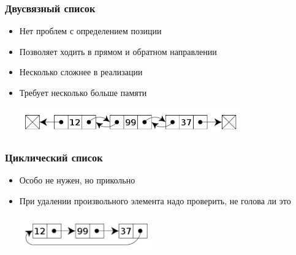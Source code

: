 \documentclass[xetex,mathserif,serif]{beamer}
\begin{document}
	\begin{frame}
		\frametitle{Двусвязный список}
		\begin{itemize}
			\item Нет проблем с определением позиции
			\item Позволяет ходить в прямом и обратном направлении
			\item Несколько сложнее в реализации
			\item Требует несколько больше памяти
			\begin{center}
				\includegraphics[width=0.75\textwidth]{double-linked-list.png}
			\end{center}
		\end{itemize}
	\end{frame}

	\begin{frame}
		\frametitle{Циклический список}
		\begin{itemize}
			\item Особо не нужен, но прикольно
			\item При удалении произвольного элемента надо проверить, не голова ли это
			\begin{center}
				\includegraphics[width=0.45\textwidth]{cyclic-list.png}
			\end{center}
		\end{itemize}
	\end{frame}
	
\end{document}
